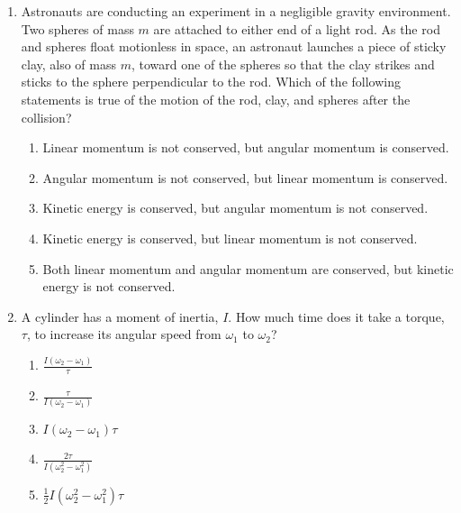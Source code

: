 \documentclass{../../../oss-classkick}
\begin{document}
\begin{multicols}{2}
\begin{enumerate}[leftmargin=18pt]
  \item Astronauts are conducting an experiment in a negligible gravity
    environment. Two spheres of mass $m$ are attached to either end of a light
    rod. As the rod and spheres float motionless in space, an astronaut
    launches a piece of sticky clay, also of mass $m$, toward one of the spheres
    so that the clay strikes and sticks to the sphere perpendicular to the rod.
    Which of the following statements is true of the motion of the rod, clay,
    and spheres after the collision?
    \begin{center}
    \end{center}
    \begin{enumerate}[nosep,leftmargin=18pt,label=(\Alph*)]
    \item Linear momentum is not conserved, but angular momentum is conserved.
    \item Angular momentum is not conserved, but linear momentum is conserved.
    \item Kinetic energy is conserved, but angular momentum is not conserved.
    \item Kinetic energy is conserved, but linear momentum is not conserved.
    \item Both linear momentum and angular momentum are conserved, but kinetic
      energy is not conserved.
    \end{enumerate}
    \vspace{.7in}
    
  \item A cylinder has a moment of inertia, $I$. How much time does it take a
    torque, $\tau$, to increase its angular speed from $\omega_1$ to
    $\omega_2$?
    \begin{enumerate}[nosep,leftmargin=18pt,label=(\Alph*)]
    \item $\displaystyle\frac{I(\omega_2-\omega_1)}{\tau}$
    \item $\displaystyle\frac{\tau}{I(\omega_2-\omega_1)}$
    \item $\displaystyle I(\omega_2-\omega_1)\tau$
    \item $\displaystyle\frac{2\tau}{I(\omega_2^2-\omega_1^2)}$
    \item $\displaystyle\frac12I(\omega_2^2-\omega_1^2)\tau$
    \end{enumerate}
    

\end{enumerate}
\end{multicols}
\end{document}

